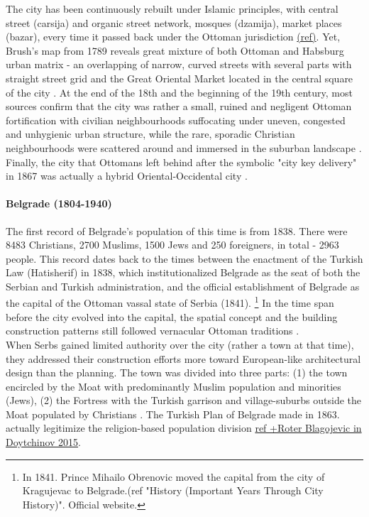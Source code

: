 \documentclass[11pt]{report}
\begin{document}
The city has been continuously rebuilt under Islamic principles, with central street (carsija) and organic street network, mosques (dzamija), market places (bazar), every time it passed back under the Ottoman jurisdiction \href{}{(ref)}.
Yet, Brush’s map from 1789 reveals great mixture of both Ottoman and Habsburg urban matrix - an overlapping of narrow, curved streets with several parts with straight street grid and the Great Oriental Market located in the central square of the city \href{}{\citealt{doytchinov_modernization_2015}}.
At the end of the 18th and the beginning of the 19th century, most sources confirm that the city was rather a small, ruined and negligent Ottoman fortification with civilian neighbourhoods suffocating under uneven, congested and unhygienic urban structure, while the rare, sporadic Christian neighbourhoods were scattered around and immersed in the suburban landscape \href{}{\citealt{doytchinov_modernization_2015}}.
Finally, the city that Ottomans left behind after the symbolic "city key delivery" in 1867 was actually a hybrid Oriental-Occidental city \href{}{\citealt{blagojevic_urban_2009}}.

\paragraph{Belgrade (1804-1940)}

The first record of Belgrade’s population of this time is from 1838.
There were 8483 Christians, 2700 Muslims, 1500 Jews and 250 foreigners, in total - 2963 people.
This record dates back to the times between the enactment of the Turkish Law (Hatisherif) in 1838, which institutionalized Belgrade as the seat of both the Serbian and Turkish administration, and the official establishment of Belgrade as the capital of the Ottoman vassal state of Serbia (1841).
\footnote{In 1841. Prince Mihailo Obrenovic moved the capital from the city of Kragujevac to Belgrade.(ref "History (Important Years Through City History)". Official website.}
In the time span before the city evolved into the capital, the spatial concept and the building construction patterns still followed vernacular Ottoman traditions \href{}{\citealt{doytchinov_modernization_2015}}.
\\

When Serbs gained limited authority over the city (rather a town at that time), they addressed their construction efforts more toward European-like architectural design than the planning. The town was divided into three parts: (1) the town encircled by the Moat with predominantly Muslim population and minorities (Jews),
(2) the Fortress with the Turkish garrison and village-suburbs outside the Moat populated by Christians \href{}{\citealt{blagojevic_urban_2009}}.
The Turkish Plan of Belgrade made in 1863. actually legitimize the religion-based population division \href{}{ref +Roter Blagojevic in Doytchinov 2015}.
\\
\end{document}
